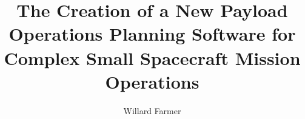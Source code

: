 \documentclass[equalmargins,oneside,openany]{ut-thesis}
\author{Willard Farmer}
\title{The Creation of a New Payload Operations Planning Software for Complex Small Spacecraft Mission Operations}
\begin{document}
\frontmatter %

    \maketitle
    \begin{abstract}
	
    \end{abstract}
    
    \begin{acknowledgements}
	
    \end{acknowledgements}
    
    \begin{spacing}{1.2}
	\tableofcontents
    \end{spacing}

    \listoffigures
    \listoftables
    \printnoidxglossary[type =\acronymtype, title=List of Acronyms]
    \cleardoublepage{}
	
\mainmatter{}


     

         
           
           

	
\begin{appendices}
\end{appendices}
    	
\backmatter{}
%
\printbibliography[heading=bibintoc, title= {References}]
\end{document}
